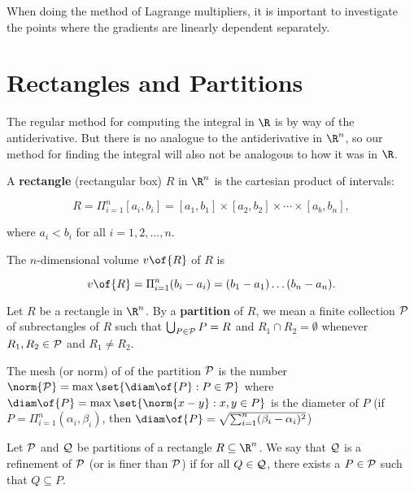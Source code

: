 \begin{remark}
    When doing the method of Lagrange multipliers, it is important to investigate the points where the gradients are linearly dependent separately.
\end{remark}

\section{Rectangles and Partitions}

\begin{remark}
    The regular method for computing the integral in $\R$ is by way of the antiderivative. But there is no analogue to the antiderivative in $\R^n$, so our method for finding the integral will also not be analogous to how it was in $\R$.
\end{remark}

\begin{definition}[a rectangle]
    A \textbf{rectangle} (rectangular box) $R$ in $\R^n$ is the cartesian product of intervals:

    \[R = \Pi_{i=1}^n [a_i,b_i] = [a_1,b_1] \times [a_2,b_2] \times \cdots \times [a_b, b_n],\]
    
    where $a_i < b_i$ for all $i = 1,2,\dots,n$.

    The $n$-dimensional volume $v\of{R}$ of $R$ is

    \[v\of{R} = \Pi_{i=1}^n (b_i - a_i) = (b_1 - a_1) \dots (b_n - a_n).\]
\end{definition}

\begin{definition}[a partition]
    Let $R$ be a rectangle in $\R^n$. By a \textbf{partition} of $R$, we mean a finite collection $\cal{P}$ of subrectangles of $R$ such that $\bigcup_{P \in \cal{P}}P = R$ and $R_1 \cap R_2 = \emptyset$ whenever $R_1, R_2 \in \cal{P}$ and $R_1 \neq R_2$.

    The mesh (or norm) of of the partition $\cal{P}$ is the number $\norm{\cal{P}} = \max\set{\diam\of{P}: P \in \cal{P}}$ where $\diam\of{P} = \max\set{\norm{x-y}: x,y \in P}$ is the diameter of $P$ (if $P = \Pi_{i=1}^n (\alpha_i, \beta_i)$, then $\diam\of{P} = \sqrt{\sum_{i=1}^{n} (\beta_i - \alpha_i)^2}$)
\end{definition}

\begin{definition}[a refinement]
    Let $\cal{P}$ and $\cal{Q}$ be partitions of a rectangle $R \subseteq \R^n$. We say that $\cal{Q}$ is a refinement of $\cal{P}$ (or is finer than $\cal{P}$) if for all $Q \in \cal{Q}$, there exists a $P \in \cal{P}$ such that $Q \subseteq P$.
\end{definition}

